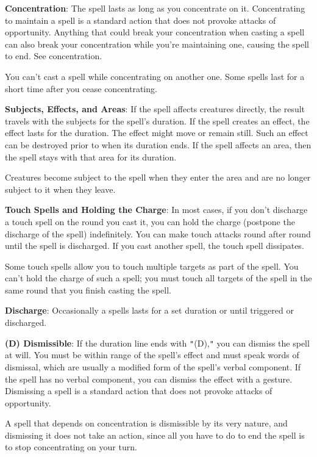 \textbf{Concentration}: The spell lasts as long as you concentrate on it. Concentrating to maintain a spell is a standard action that does not provoke attacks of opportunity. Anything that could break your concentration when casting a spell can also break your concentration while you're maintaining one, causing the spell to end. See concentration.
				
You can't cast a spell while concentrating on another one. Some spells last for a short time after you cease concentrating.
				
\textbf{Subjects, Effects, and Areas}: If the spell affects creatures directly, the result travels with the subjects for the spell's duration. If the spell creates an effect, the effect lasts for the duration. The effect might move or remain still. Such an effect can be destroyed prior to when its duration ends. If the spell affects an area, then the spell stays with that area for its duration. 
				
Creatures become subject to the spell when they enter the area and are no longer subject to it when they leave.
				
\textbf{Touch Spells and Holding the Charge}: In most cases, if you don't discharge a touch spell on the round you cast it, you can hold the charge (postpone the discharge of the spell) indefinitely. You can make touch attacks round after round until the spell is discharged. If you cast another spell, the touch spell dissipates.
				
Some touch spells allow you to touch multiple targets as part of the spell. You can't hold the charge of such a spell; you must touch all targets of the spell in the same round that you finish casting the spell.
				
\textbf{Discharge}: Occasionally a spells lasts for a set duration or until triggered or discharged.
				
\textbf{(D) Dismissible}: If the duration line ends with \texttt{{}"{}}(D),\texttt{{}"{}} you can dismiss the spell at will. You must be within range of the spell's effect and must speak words of dismissal, which are usually a modified form of the spell's verbal component. If the spell has no verbal component, you can dismiss the effect with a gesture. Dismissing a spell is a standard action that does not provoke attacks of opportunity.
				
A spell that depends on concentration is dismissible by its very nature, and dismissing it does not take an action, since all you have to do to end the spell is to stop concentrating on your turn.
				
